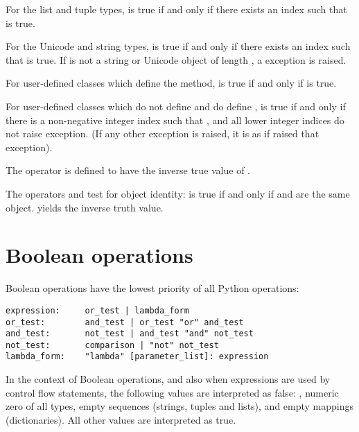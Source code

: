 For the list and tuple types,  is true if and
only if there exists an index  such that
 is true.

For the Unicode and string types,  is true if
and only if there exists an index  such that  is true. If  is not a string or
Unicode object of length , a  exception
is raised.

For user-defined classes which define the  method,
 is true if and only if
 is true.

For user-defined classes which do not define  and
do define ,  is true if
and only if there is a non-negative integer index  such that
, and all lower integer indices
do not raise  exception. (If any other exception
is raised, it is as if  raised that exception).

The operator  is defined to have the inverse true value
of .

The operators  and  test for object identity:
 is true if and only if  and 
are the same object.   yields the inverse
truth value.

\section{Boolean operations\label{Booleans}}

Boolean operations have the lowest priority of all Python operations:

\begin{verbatim}
expression:     or_test | lambda_form
or_test:        and_test | or_test "or" and_test
and_test:       not_test | and_test "and" not_test
not_test:       comparison | "not" not_test
lambda_form:	"lambda" [parameter_list]: expression
\end{verbatim}

In the context of Boolean operations, and also when expressions are
used by control flow statements, the following values are interpreted
as false: , numeric zero of all types, empty sequences
(strings, tuples and lists), and empty mappings (dictionaries).  All
other values are interpreted as true.

